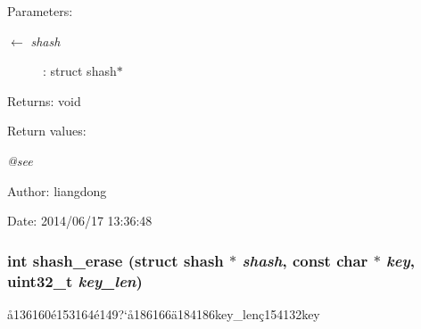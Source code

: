 \begin{Desc}
\item[Parameters:]
\begin{description}
\item[\mbox{$\leftarrow$} {\em shash}]: struct shash$\ast$ \end{description}
\end{Desc}
\begin{Desc}
\item[Returns:]void \end{Desc}
\begin{Desc}
\item[Return values:]
\begin{description}
\item[{\em @see}]\end{description}
\end{Desc}
\begin{Desc}
\item[Author:]liangdong \end{Desc}
\begin{Desc}
\item[Date:]2014/06/17 13:36:48 \end{Desc}
\subsubsection{\setlength{\rightskip}{0pt plus 5cm}int shash\_\-erase (struct shash $\ast$ {\em shash}, const char $\ast$ {\em key}, uint32\_\-t {\em key\_\-len})}\label{shash_8c_a9}


\aa{}136160\'{e}153164\'{e}149?`\aa{}186166\"{a}184186key\_\-len\c{c}154132key 

